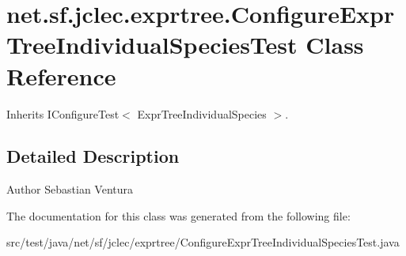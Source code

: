 \hypertarget{classnet_1_1sf_1_1jclec_1_1exprtree_1_1_configure_expr_tree_individual_species_test}{\section{net.\-sf.\-jclec.\-exprtree.\-Configure\-Expr\-Tree\-Individual\-Species\-Test Class Reference}
\label{classnet_1_1sf_1_1jclec_1_1exprtree_1_1_configure_expr_tree_individual_species_test}
}


Inherits I\-Configure\-Test$<$ Expr\-Tree\-Individual\-Species $>$.



\subsection{Detailed Description}
\begin{DoxyAuthor}{Author}
Sebastian Ventura 
\end{DoxyAuthor}


The documentation for this class was generated from the following file\-:\begin{DoxyCompactItemize}
\item 
src/test/java/net/sf/jclec/exprtree/Configure\-Expr\-Tree\-Individual\-Species\-Test.\-java\end{DoxyCompactItemize}
